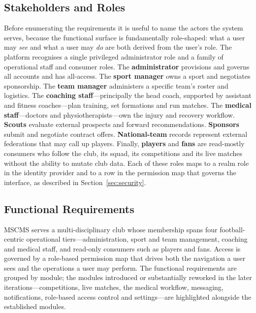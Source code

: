 \subsection{Stakeholders and Roles}
\label{sec:roles}

Before enumerating the requirements it is useful to name the actors the system
serves, because the functional surface is fundamentally role-shaped: what a user may
\emph{see} and what a user may \emph{do} are both derived from the user's role. The
platform recognises a single privileged administrator role and a family of
operational staff and consumer roles. The \textbf{administrator} provisions and
governs all accounts and has all-access. The \textbf{sport manager} owns a sport and
negotiates sponsorship. The \textbf{team manager} administers a specific team's
roster and logistics. The \textbf{coaching staff}---principally the head coach,
supported by assistant and fitness coaches---plan training, set formations and run
matches. The \textbf{medical staff}---doctors and physiotherapists---own the injury
and recovery workflow. \textbf{Scouts} evaluate external prospects and forward
recommendations. \textbf{Sponsors} submit and negotiate contract offers.
\textbf{National-team} records represent external federations that may call up
players. Finally, \textbf{players} and \textbf{fans} are read-mostly consumers who
follow the club, its squad, its competitions and its live matches without the ability
to mutate club data. Each of these roles maps to a realm role in the identity
provider and to a row in the permission map that governs the interface, as described
in Section~\ref{sec:security}.

\subsection{Functional Requirements}
\label{sec:functional-requirements}

MSCMS serves a multi-disciplinary club whose membership spans four football-centric
operational tiers---administration, sport and team management, coaching and medical
staff, and read-only consumers such as players and fans. Access is governed by a
role-based permission map that drives both the navigation a user sees and the
operations a user may perform. The functional requirements are grouped by module; the
modules introduced or substantially reworked in the later iterations---competitions,
live matches, the medical workflow, messaging, notifications, role-based access
control and settings---are highlighted alongside the established modules.

